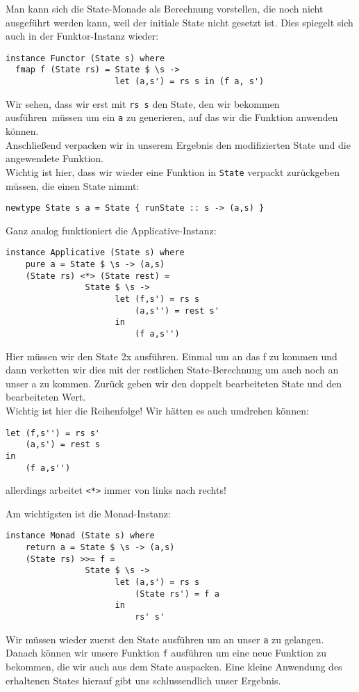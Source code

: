 \documentclass{beamer}
\begin{document}
\begin{frame}[fragile]
Man kann sich die State-Monade als Berechnung vorstellen, die noch nicht ausgeführt werden kann, weil der initiale State nicht gesetzt ist. Dies spiegelt sich auch in der Funktor-Instanz wieder:
\pause
\begin{verbatim}
instance Functor (State s) where
  fmap f (State rs) = State $ \s -> 
                      let (a,s') = rs s in (f a, s')
\end{verbatim}
\pause
Wir sehen, dass wir erst mit \texttt{rs s} den State, den wir bekommen \glqq ausführen\grqq \ müssen um ein \texttt{a} zu generieren, auf das wir die Funktion anwenden können.\\
Anschließend verpacken wir in unserem Ergebnis den modifizierten State und die angewendete Funktion.\\
\pause
Wichtig ist hier, dass wir wieder eine Funktion in \texttt{State} verpackt zurückgeben müssen, die einen State nimmt:
\begin{verbatim}
newtype State s a = State { runState :: s -> (a,s) }
\end{verbatim}

\end{frame}

\begin{frame}[fragile]
Ganz analog funktioniert die Applicative-Instanz:
\begin{verbatim}
instance Applicative (State s) where
    pure a = State $ \s -> (a,s)
    (State rs) <*> (State rest) =
                State $ \s ->
                      let (f,s') = rs s
                          (a,s'') = rest s'
                      in
                          (f a,s'')
\end{verbatim}
\pause
Hier müssen wir den State 2x ausführen. Einmal um an das f zu kommen und dann verketten wir dies mit der restlichen State-Berechnung um auch noch an unser a zu kommen. Zurück geben wir den doppelt bearbeiteten State und den bearbeiteten Wert.\\
\pause
Wichtig ist hier die Reihenfolge! Wir hätten es auch umdrehen können:
\begin{verbatim}
let (f,s'') = rs s'
    (a,s') = rest s
in
    (f a,s'')
\end{verbatim}
allerdings arbeitet \texttt{<*>} immer von links nach rechts!
\end{frame}

\begin{frame}[fragile]
Am wichtigsten ist die Monad-Instanz:
\begin{verbatim}
instance Monad (State s) where
    return a = State $ \s -> (a,s)
    (State rs) >>= f =
                State $ \s ->
                      let (a,s') = rs s
                          (State rs') = f a
                      in
                          rs' s'
\end{verbatim}
\pause
Wir müssen wieder zuerst den State ausführen um an unser \texttt{a} zu gelangen. Danach können wir unsere Funktion \texttt{f} ausführen um eine neue Funktion zu bekommen, die wir auch aus dem State auspacken. Eine kleine Anwendung des erhaltenen States hierauf gibt uns schlussendlich unser Ergebnis.
\end{frame}
\end{document}
